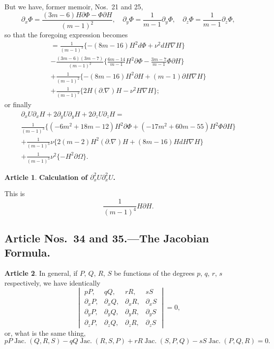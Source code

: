 \documentclass[11pt,a4paper]{article}
\theoremstyle{definition}
\newtheorem{art}{Article}[section]
\DeclareMathOperator{\Jac}{Jac.}
\begin{document}
But we have, former memoir, Nos.\ 21 and 25,
\[
\partial_x \Phi = \frac{(3m-6)H \partial \Phi - \Phi \partial H}{(m-1)^2},
\quad
\partial_y \Phi = \frac{1}{m-1}\partial_y \Phi, \quad
\partial_z \Phi = \frac{1}{m-1}\partial_z \Phi,
\]
so that the foregoing expression becomes
\begin{multline*}
= \frac{1}{(m-1)^3}\{-(8m-16)H^2 d\Phi + \nu^2 dH \nabla H\} \\
- \frac{(3m-6)(3m-7)}{(m-1)^2}\bigl\{\tfrac{6m-14}{m-1}H^2 \partial \Phi
- \tfrac{3m-7}{m-1}\Phi \partial H\bigr\} \\
+ \frac{1}{(m-1)^2}\{-(8m-16)H^2 \partial H + (m-1)\partial H \nabla H\} \\
+ \frac{1}{(m-1)^2}\{2H(\partial . \nabla)H - \nu^2 H \nabla H\};
\end{multline*}
or finally
\begin{multline*}
\partial_x U \partial_x H + 2\partial_y U \partial_y H + 2\partial_z U \partial_z H = \\
\frac{1}{(m-1)^3}\{(-6m^2 + 18m - 12)H^2 \partial \Phi + (-17m^2 + 60m - 55)H^2 \Phi \partial H\} \\
+ \frac{1}{(m-1)^3} \nu \{2(m-2)H^2(\partial . \nabla)H + (8m-16)H dH \nabla H\} \\
+ \frac{1}{(m-1)^3}\nu^2 \{-H^2 \partial \Omega\}.
\end{multline*}

\begin{art}
\textbf{Calculation of $\partial_x^2 U \partial_x^2 U$.}

This is
\[
\frac{1}{(m-1)^4}H \partial H.
\]
\end{art}

\subsection*{Article Nos.\ 34 and 35.---The Jacobian Formula.}

\setcounter{art}{33}
\begin{art}
In general, if $P$, $Q$, $R$, $S$ be functions of the degrees $p$, $q$, $r$, $s$ respectively,
we have identically
\[
\begin{vmatrix}
pP, & qQ, & rR, & sS \\
\partial_x P, & \partial_x Q, & \partial_x R, & \partial_x S \\
\partial_y P, & \partial_y Q, & \partial_y R, & \partial_y S \\
\partial_z P, & \partial_z Q, & \partial_z R, & \partial_z S
\end{vmatrix}
= 0,
\]
or, what is the same thing,
\[
pP \Jac(Q, R, S) - qQ \Jac(R, S, P) + rR \Jac(S, P, Q) - sS \Jac(P, Q, R) = 0.
\]
\end{art}
\end{document}
